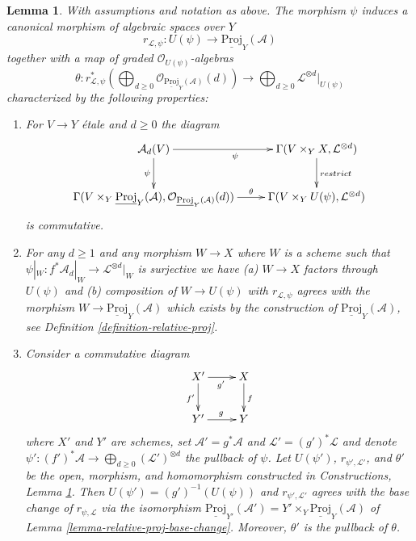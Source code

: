 \documentclass{stacks-project}
\theoremstyle{plain}
\newtheorem{lemma}[subsection]{Lemma}
\theoremstyle{definition}
\theoremstyle{remark}
\numberwithin{equation}{subsection}
\begin{document}
\begin{lemma}
\label{lemma-invertible-map-into-relative-proj}
With assumptions and notation as above. The morphism
$\psi$ induces a canonical morphism of algebraic spaces over $Y$
$$
r_{\mathcal{L}, \psi} :
U(\psi) \longrightarrow \underline{\text{Proj}}_Y(\mathcal{A})
$$
together with a map of graded $\mathcal{O}_{U(\psi)}$-algebras
$$
\theta :
r_{\mathcal{L}, \psi}^*\left(
\bigoplus\nolimits_{d \geq 0}
\mathcal{O}_{\underline{\text{Proj}}_Y(\mathcal{A})}(d)
\right)
\longrightarrow
\bigoplus\nolimits_{d \geq 0} \mathcal{L}^{\otimes d}|_{U(\psi)}
$$
characterized by the following properties:
\begin{enumerate}
\item For $V \to Y$ \'etale and $d \geq 0$ the diagram
$$
\xymatrix{
\mathcal{A}_d(V) \ar[d]_{\psi} \ar[r]_{\psi} &
\Gamma(V \times_Y X, \mathcal{L}^{\otimes d}) \ar[d]^{restrict} \\
\Gamma(V \times_Y \underline{\text{Proj}}_Y(\mathcal{A}),
\mathcal{O}_{\underline{\text{Proj}}_Y(\mathcal{A})}(d)) \ar[r]^-\theta &
\Gamma(V \times_Y U(\psi), \mathcal{L}^{\otimes d})
}
$$
is commutative.
\item For any $d \geq 1$ and any morphism $W \to X$ where $W$ is a scheme
such that $\psi|_W : f^*\mathcal{A}_d|_W \to \mathcal{L}^{\otimes d}|_W$
is surjective we have (a) $W \to X$ factors through $U(\psi)$ and
(b) composition of $W \to U(\psi)$ with $r_{\mathcal{L}, \psi}$
agrees with the morphism $W \to \underline{\text{Proj}}_Y(\mathcal{A})$
which exists by the construction of $\underline{\text{Proj}}_Y(\mathcal{A})$,
see Definition \ref{definition-relative-proj}.
\item Consider a commutative diagram
$$
\xymatrix{
X' \ar[r]_{g'} \ar[d]_{f'} & X \ar[d]^f \\
Y' \ar[r]^g & Y
}
$$
where $X'$ and $Y'$ are schemes, set $\mathcal{A}' = g^*\mathcal{A}$
and $\mathcal{L}' = (g')^*\mathcal{L}$ and denote
$\psi' : (f')^*\mathcal{A} \to \bigoplus_{d \geq 0} (\mathcal{L}')^{\otimes d}$
the pullback of $\psi$. Let $U(\psi')$, $r_{\psi', \mathcal{L}'}$,
and $\theta'$ be the open, morphism, and homomorphism constructed
in Constructions, Lemma \ref{lemma-invertible-map-into-relative-proj}.
Then $U(\psi') = (g')^{-1}(U(\psi))$
and $r_{\psi', \mathcal{L}'}$ agrees with the base change
of $r_{\psi, \mathcal{L}}$ via the isomorphism
$\underline{\text{Proj}}_{Y'}(\mathcal{A}') =
Y' \times_Y \underline{\text{Proj}}_Y(\mathcal{A})$
of Lemma \ref{lemma-relative-proj-base-change}.
Moreover, $\theta'$ is the pullback of $\theta$.
\end{enumerate}
\end{lemma}
\end{document}
